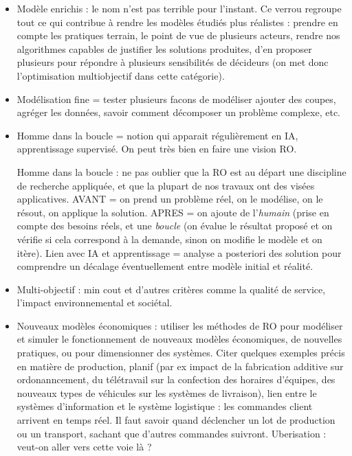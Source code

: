 	
	\begin{itemize}
		\item Modèle enrichis : le nom n'est pas terrible pour l'instant. Ce verrou regroupe tout ce qui contribue à rendre les modèles étudiés plus réalistes : prendre en compte les pratiques terrain, le point de vue de plusieurs acteurs, rendre nos algorithmes capables de justifier les solutions produites, d'en proposer plusieurs pour répondre à plusieurs sensibilités de décideurs (on met donc l'optimisation multiobjectif dans cette catégorie).
		
		\item Modélisation fine = tester plusieurs facons de modéliser ajouter des coupes, agréger les données, savoir comment décomposer un problème complexe, etc.
	
	\item 	Homme dans la boucle = notion qui apparait régulièrement en IA, apprentissage supervisé. On peut très bien en faire une vision RO. 
	
	Homme dans la boucle : ne pas oublier que la RO est au départ une discipline de recherche appliquée, et que la plupart de nos travaux ont des visées applicatives. AVANT = on prend un problème réel, on le modélise, on le résout, on applique la solution. APRES = on ajoute de l'\textit{humain} (prise en compte des besoins réels, et une \textit{boucle} (on évalue le résultat proposé et on vérifie si cela correspond à la demande, sinon on modifie le modèle et on itère). Lien avec IA et apprentissage = analyse a posteriori des solution pour comprendre un décalage éventuellement entre modèle initial et réalité. 
	
	\item Multi-objectif : min cout et d'autres critères comme la qualité de service, l'impact environnemental et sociétal. 
	
	\item Nouveaux modèles économiques : utiliser les méthodes de RO pour modéliser et simuler le fonctionnement de nouveaux modèles économiques, de nouvelles pratiques, ou pour dimensionner des systèmes. 
	Citer quelques exemples précis en matière de production, planif (par ex impact de la fabrication additive sur ordonanncement, du télétravail sur la confection des horaires d'équipes, des nouveaux types de véhicules sur les systèmes de livraison), lien entre le systèmes d'information et le système logistique : les commandes client arrivent en temps réel. Il faut savoir quand déclencher un lot de production ou un transport, sachant que d'autres commandes suivront. Uberisation : veut-on aller vers cette voie là ? 
	
		\end{itemize}

